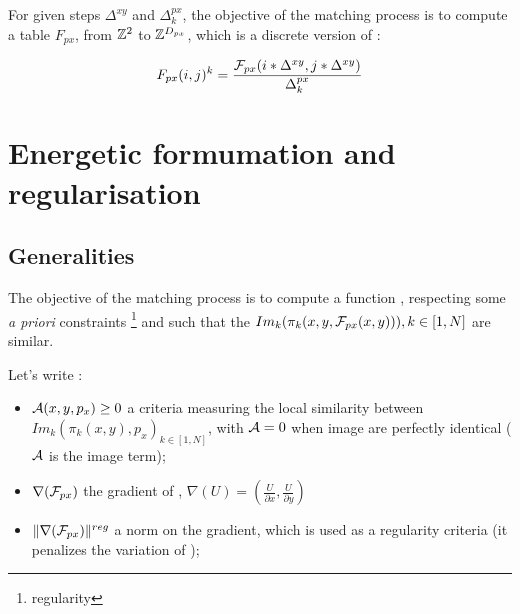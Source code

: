 For given steps $\Delta^{xy}$ and $\Delta^{px}_k$, the objective of
the matching process is to compute a table $F_{px}$, from $\ZZ^2$  to
$\ZZ^{\DimPx}$, which is a discrete version of \FPx:


\begin{equation}
   F_{px}(i,j)^k = \frac{\FPx(i*\Delta^{xy},j*\Delta^{xy})}{\Delta^{px}_k}
\end{equation}





\section{Energetic formumation and regularisation}

\subsection{Generalities}

\label{AM:Appr:Energ}


The objective of the matching process is to compute a function
\FPx , respecting some \emph{a priori} constraints \footnote{regularity}
and such that the $Im_k(\pi_k(x,y,\FPx(x,y))),k\in [1,N]$ are similar.



Let's write :

\begin{itemize}
     \item $\Ress(x,y,p_x) \geq 0$  a criteria measuring the
            local similarity between 
            $Im_k(\pi_k(x,y),p_x)_{k\in [1,N]}$, with $\Ress=0$
            when image are perfectly identical ($\Ress$ is the image term);

      \item $\nabla(\FPx)$ the gradient of \FPx, 
             $\nabla(U) = (\frac{U}{\partial x}, \frac{U}{\partial y})$

      \item $\| \nabla(\FPx) \|^{reg}$ a norm on the gradient, which is used as
            a regularity criteria (it penalizes the variation of \FPx);
\end{itemize}


